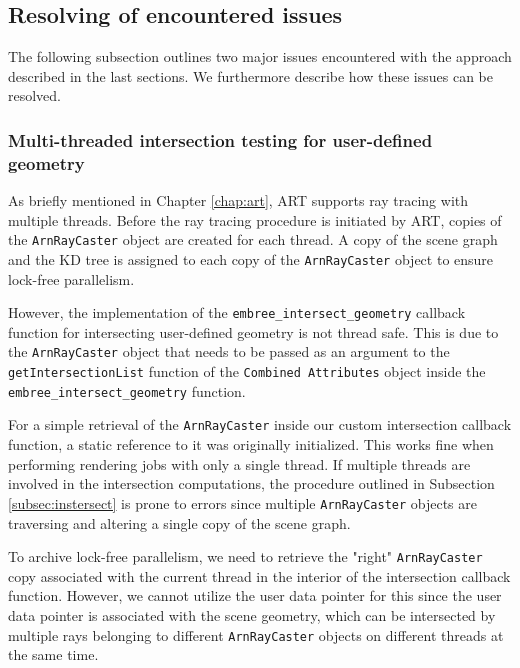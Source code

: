 \subsection{Resolving of encountered issues}
\label{sec:issues_user}
The following subsection outlines two major issues encountered with the approach described in the last sections. We furthermore describe how these issues can be resolved.

\subsubsection{Multi-threaded intersection testing for user-defined geometry}
As briefly mentioned in Chapter \ref{chap:art}, ART supports ray tracing with multiple threads.
Before the ray tracing procedure is initiated by ART, copies of the \texttt{ArnRayCaster} object are created for each thread. A copy of the scene graph and the KD tree is assigned to each copy of the \texttt{ArnRayCaster} object to ensure lock-free parallelism.

However, the implementation of the \texttt{embree\_intersect\_geometry} callback function for intersecting user-defined geometry is not thread safe. This is due to the \texttt{ArnRayCaster} object that needs to be passed as an argument to the \texttt{getIntersectionList} function of the \texttt{Combined Attributes} object inside the \texttt{embree\_intersect\_geometry} function.

For a simple retrieval of the \texttt{ArnRayCaster} inside our custom intersection callback function, a static reference to it was originally initialized. This works fine when performing rendering jobs with only a single thread. If multiple threads are involved in the intersection computations, the procedure outlined in Subsection \ref{subsec:instersect} is prone to errors since multiple \texttt{ArnRayCaster} objects are traversing and altering a single copy of the scene graph.

To archive lock-free parallelism, we need to retrieve the "right" \texttt{ArnRayCaster} copy associated with the current thread in the interior of the intersection callback function. However, we cannot utilize the user data pointer for this since the user data pointer is associated with the scene geometry, which can be intersected by multiple rays belonging to different \texttt{ArnRayCaster} objects on different threads at the same time.

